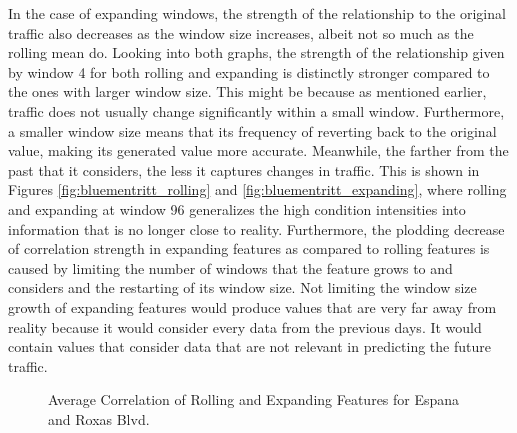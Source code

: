 In the case of expanding windows, the strength of the relationship to the original traffic also decreases as the window size increases, albeit not so much as the rolling mean do. Looking into both graphs, the strength of the relationship given by window 4 for both rolling and expanding is distinctly stronger compared to the ones with larger window size. This might be because as mentioned earlier, traffic does not usually change significantly within a small window. Furthermore, a smaller window size means that its frequency of reverting back to the original value, making its generated value more accurate. Meanwhile, the farther from the past that it considers, the less it captures changes in traffic. This is shown in Figures \ref{fig:bluementritt_rolling} and \ref{fig:bluementritt_expanding}, where rolling and expanding at window 96 generalizes the high condition intensities into information that is no longer close to reality. Furthermore, the plodding decrease of correlation strength in expanding features as compared to rolling features is caused by limiting the number of windows that the feature grows to and considers and the restarting of its window size. Not limiting the window size growth of expanding features would produce values that are very far away from reality because it would consider every data from the previous days. It would contain values that consider data that are not relevant in predicting the future traffic.



\begin{figure}
    \centering
      \captionsetup{justification=centering}
    \hfill
    \caption{Average Correlation of Rolling and Expanding Features for Espana and Roxas Blvd.}
\end{figure}

